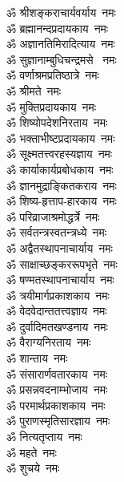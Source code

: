 \begin{multicols}{2}
    \begin{flushleft}
        ॐ श्रीशङ्कराचार्यवर्याय~नमः\\
        ॐ ब्रह्मानन्दप्रदायकाय~नमः\\
        ॐ अज्ञानतिमिरादित्याय~नमः\\
        ॐ सुज्ञानाम्बुधिचन्द्रमसे ~नमः\\
        ॐ वर्णाश्रमप्रतिष्ठात्रे~नमः\\
        ॐ श्रीमते~नमः\\
        ॐ मुक्तिप्रदायकाय~नमः\\
        ॐ शिष्योपदेशनिरताय~नमः\\
        ॐ भक्ताभीष्टप्रदायकाय~नमः\\
        ॐ सूक्ष्मतत्त्वरहस्यज्ञाय~नमः\hfill{}\\
                                        
        ॐ कार्याकार्यप्रबोधकाय~नमः\\
        ॐ ज्ञानमुद्राङ्कितकराय~नमः\\
        ॐ शिष्य-हृत्ताप-हारकाय~नमः\\
        ॐ परिव्राजाश्रमोद्धर्त्रे~नमः\\
        ॐ सर्वतन्त्रस्वतन्त्रध्ये~नमः\\
        ॐ अद्वैतस्थापनाचार्याय~नमः\\
        ॐ साक्षाच्छङ्कररूपभृते~नमः\\
        ॐ षण्मतस्थापनाचार्याय~नमः\\
        ॐ त्रयीमार्गप्रकाशकाय~नमः\\
        ॐ वेदवेदान्ततत्त्वज्ञाय~नमः\hfill{}\\
                                        
        ॐ दुर्वादिमतखण्डनाय~नमः\\
        ॐ वैराग्यनिरताय~नमः\\
        ॐ शान्ताय~नमः\\
        ॐ संसारार्णवतारकाय~नमः\\
        ॐ प्रसन्नवदनाम्भोजाय~नमः\\
        ॐ परमार्थप्रकाशकाय~नमः\\
        ॐ पुराणस्मृतिसारज्ञाय~नमः\\
        ॐ नित्यतृप्ताय~नमः\\
        ॐ महते~नमः\\
        ॐ शुचये~नमः\hfill{}\\
                                        

\end{flushleft}
\end{multicols}
